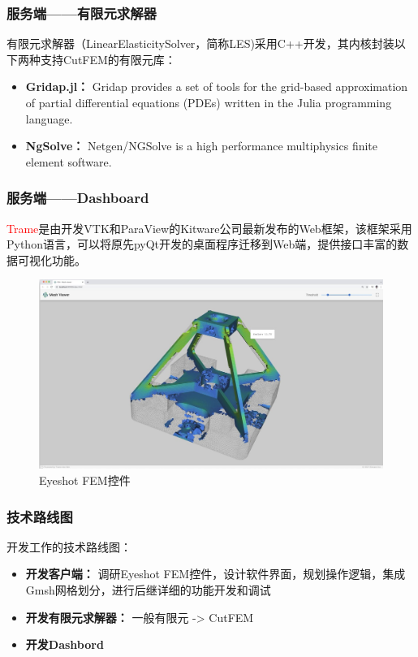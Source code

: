 \documentclass[lang=en,aspectratio=43,theme=default,logo=on]{simplebeamer}
\begin{document}
\begin{frame}[fragile]
    \frametitle{服务端——有限元求解器}
    有限元求解器（LinearElasticitySolver，简称LES)采用C++开发，其内核封装以下两种支持CutFEM的有限元库：
    \begin{itemize}
        \item \textbf{Gridap.jl：} Gridap provides a set of tools for the grid-based approximation of partial differential equations (PDEs) written in the Julia programming language.
        \item \textbf{NgSolve：} Netgen/NGSolve is a high performance multiphysics finite element software.
    \end{itemize}
\end{frame}

\begin{frame}[fragile]
    \frametitle{服务端——Dashboard}
    \textcolor{red}{Trame}是由开发VTK和ParaView的Kitware公司最新发布的Web框架，该框架采用Python语言，可以将原先pyQt开发的桌面程序迁移到Web端，提供接口丰富的数据可视化功能。
     \begin{figure}
        \centering %
        \includegraphics[height=0.5\textheight]{./img/trame.jpg}
        \caption{Eyeshot FEM控件}
    \end{figure}
\end{frame}

\begin{frame}[fragile]
    \frametitle{技术路线图}
    开发工作的技术路线图：
    \begin{itemize}
        \item \textbf{开发客户端：}  调研Eyeshot FEM控件，设计软件界面，规划操作逻辑，集成Gmsh网格划分，进行后继详细的功能开发和调试
        \item \textbf{开发有限元求解器：}  一般有限元 -> CutFEM
        \item \textbf{开发Dashbord}
    \end{itemize}
\end{frame}
\end{document}
